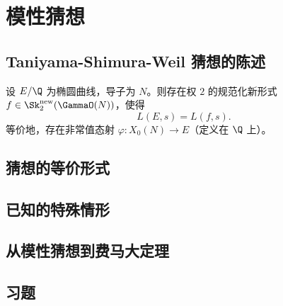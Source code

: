 \chapter{模性猜想}
\label{ch:modularity-conjecture}

\section{Taniyama-Shimura-Weil 猜想的陈述}

\begin{conjecture}
\label{conj:modularity}
设 $E/\Q$ 为椭圆曲线，导子为 $N$。则存在权 $2$ 的规范化新形式
$f \in \Sk_2^{\mathrm{new}}(\GammaO(N))$，使得
\[
  L(E, s) = L(f, s).
\]
等价地，存在非常值态射 $\varphi\colon X_0(N) \to E$（定义在 $\Q$ 上）。
\end{conjecture}

\section{猜想的等价形式}


\section{已知的特殊情形}


\section{从模性猜想到费马大定理}


\section{习题}
